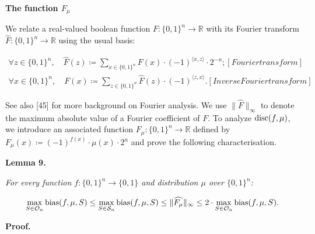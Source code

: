 \documentclass[10pt,a4paper]{article}
\begin{document}
\par\medskip\noindent\textbf{The function $F_{\mu}$
}\par




We relate a real-valued boolean function $F\colon\{0,1\}^{n}\to\mathbb{R}$ with its Fourier transform $\widehat{F}:\{0,1\}^{n}\to\mathbb{R}$ using the usual basis:\par


\[\begin{gathered}
\displaystyle\forall z\in\{0,1\}^{n},\quad\widehat{F}(z) \displaystyle\coloneqq\sum\nolimits_{x\in\{0,1\}^{n}}F(x)\cdot(-1)^{\langle x,z\rangle}\cdot 2^{-n}; [Fourier transform] \\
\displaystyle\forall x\in\{0,1\}^{n},\quad F(x) \displaystyle\coloneqq\sum\nolimits_{z\in\{0,1\}^{n}}\widehat{F}(z)\cdot(-1)^{\langle z,x\rangle}. [Inverse Fourier transform]
\end{gathered}\]


See also [45] for more background on Fourier analysis. We use $\|\widehat{F}\|_{\infty}$ to denote the maximum absolute value of a Fourier coefficient of $F$. To analyze ${\textup{disc}}(f,\mu)$, we introduce an associated function $F_{\mu}\colon\{0,1\}^{n}\to\mathbb{R}$ defined by $F_{\mu}(x)\coloneqq(-1)^{f(x)}\cdot\mu(x)\cdot 2^{n}$ and prove the following characterisation.\par





\par\medskip\noindent\textbf{
\textbf{Lemma 9}\textbf{.}
}\par



\emph{For every function $f\colon\{0,1\}^{n}\to\{0,1\}$ and distribution $\mu$ over $\{0,1\}^{n}$:}\par


\[\begin{gathered}
\max_{S\in\mathcal{O}_{n}}{\textup{bias}}(f,\mu,S)\leq\max_{S\in\mathcal{S}_{n}}{\textup{bias}}(f,\mu,S)\leq\|\widehat{F_{\mu}}\|_{\infty}\leq 2\cdot\max_{S\in\mathcal{O}_{n}}{\textup{bias}}(f,\mu,S).
\end{gathered}\]






\par\medskip\noindent\textbf{Proof.}\par
\end{document}
